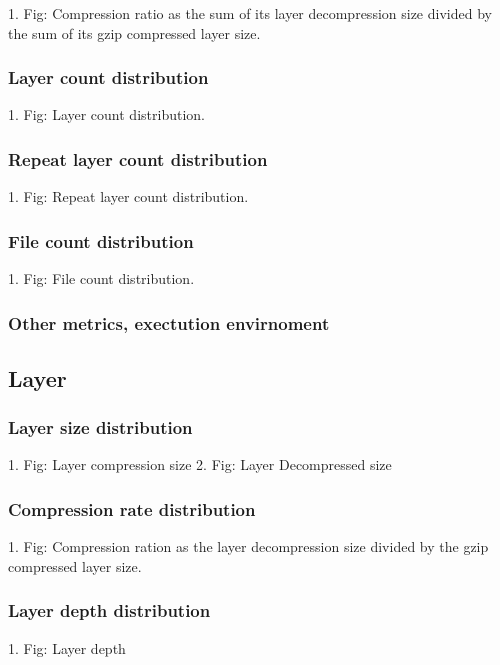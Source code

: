 1. Fig: Compression ratio as the sum of its layer decompression size divided by the sum of its gzip compressed layer size.

\subsubsection{Layer count distribution}

1. Fig: Layer count distribution.

\subsubsection{Repeat layer count distribution}

1. Fig: Repeat layer count distribution.

\subsubsection{File count distribution}

1. Fig: File count distribution.

\subsubsection{Other metrics, exectution envirnoment}

\subsection{Layer}

\subsubsection{Layer size distribution}

1. Fig: Layer compression size
2. Fig: Layer Decompressed size

\subsubsection{Compression rate distribution}

1. Fig: Compression ration as the layer decompression size divided by the gzip compressed layer size.

\subsubsection{Layer depth distribution}

1. Fig: Layer depth

